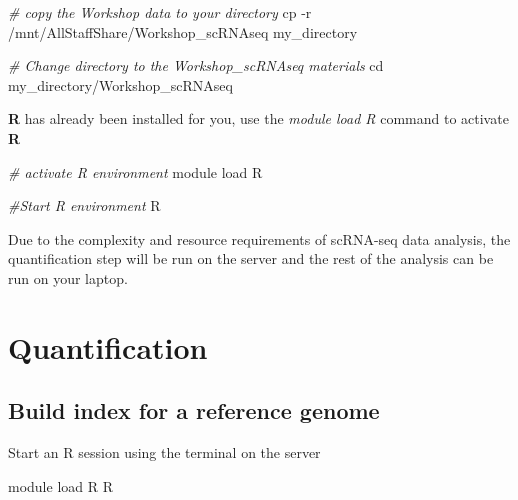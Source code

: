 \documentclass[
]{book}
\newenvironment{Shaded}{\begin{snugshade}}{\end{snugshade}}
\newcommand{\AttributeTok}[1]{\textcolor[rgb]{0.77,0.63,0.00}{#1}}
\newcommand{\BuiltInTok}[1]{#1}
\newcommand{\CommentTok}[1]{\textcolor[rgb]{0.56,0.35,0.01}{\textit{#1}}}
\newcommand{\ExtensionTok}[1]{#1}
\newcommand{\FunctionTok}[1]{\textcolor[rgb]{0.00,0.00,0.00}{#1}}
\newcommand{\NormalTok}[1]{#1}
\begin{document}
\begin{Shaded}
\begin{Highlighting}[]
\CommentTok{\# copy the Workshop data to your directory}
\FunctionTok{cp} \AttributeTok{{-}r}\NormalTok{ /mnt/AllStaffShare/Workshop\_scRNAseq my\_directory}
\end{Highlighting}
\end{Shaded}

\begin{Shaded}
\begin{Highlighting}[]
\CommentTok{\# Change directory to the Workshop\_scRNAseq materials}
\BuiltInTok{cd}\NormalTok{ my\_directory/Workshop\_scRNAseq}
\end{Highlighting}
\end{Shaded}

\textbf{R} has already been installed for you, use the \emph{module load R} command to activate \textbf{R}

\begin{Shaded}
\begin{Highlighting}[]
\CommentTok{\# activate R environment}
\ExtensionTok{module}\NormalTok{ load R}
\end{Highlighting}
\end{Shaded}

\begin{Shaded}
\begin{Highlighting}[]
\CommentTok{\#Start R environment}
\ExtensionTok{R}
\end{Highlighting}
\end{Shaded}

Due to the complexity and resource requirements of scRNA-seq data analysis, the quantification step will be run on the server and the rest of the analysis can be run on your laptop.

\hypertarget{quantification-1}{%
\chapter{Quantification}\label{quantification-1}}

\hypertarget{build-index-for-a-reference-genome}{%
\section{Build index for a reference genome}\label{build-index-for-a-reference-genome}}

Start an R session using the terminal on the server

\begin{Shaded}
\begin{Highlighting}[]
\ExtensionTok{module}\NormalTok{ load R}
\ExtensionTok{R}
\end{Highlighting}
\end{Shaded}
\end{document}
